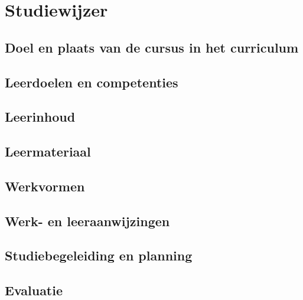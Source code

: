 \chapter{Studiewijzer}
\label{ch:studiewijzer}

\lipsum[1-2]

\section{Doel en plaats van de cursus in het curriculum}
\label{sec:doel-en-plaats}

\lipsum[3-4]

\section{Leerdoelen en competenties}
\label{sec:leerdoelen}

\lipsum[5-6]

\section{Leerinhoud}
\label{sec:leerinhoud}

\lipsum[7-9]

\section{Leermateriaal}
\label{sec:leermateriaal}

\lipsum[10-12]

\section{Werkvormen}
\label{sec:werkvormen}

\lipsum[13]

\section{Werk- en leeraanwijzingen}
\label{sec:werk-en-leeraanwijzingen}

\lipsum[14]

\section{Studiebegeleiding en planning}
\label{sec:studiebegeleiding-en-planning}

\lipsum[15]

\section{Evaluatie}
\label{sec:evaluatie}

\lipsum[16-18]

